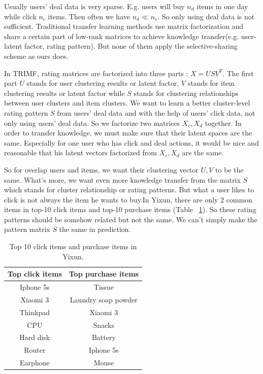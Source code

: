 Usually users' deal data is very sparse. E.g. users will buy $n_d$ items in one day while click $n_c$ items. Then often we have $n_d \ll n_c$. So only using deal data is not sufficient. Traditional transfer learning methods use matrix factorization and share a certain part of low-rank matrices to achieve knowledge transfer(e.g. user-latent factor, rating pattern). But none of them apply the selective-sharing scheme as ours does.

In TRIMF, rating matrices are factorized into three parts : $X = USV^T$. The first part $U$ stands for user clustering results or latent factor, $V$ stands for item clustering results or latent factor while $S$ stands for clustering relationships between user clusters and item clusters. We want to learn a better cluster-level rating pattern $S$ from users' deal data and with the help of users' click data, not only using users' deal data. So we factorize two matrices $X_c, X_d$ together. In order to transfer knowledge, we must make sure that their latent spaces are the same. Especially for one user who has click and deal actions, it would be nice and reasonable that his latent vectors factorized from $X_c, X_d$ are the same.

So for overlap users and items, we want their clustering vector $U,V$ to be the same. What's more, we want even more knowledge transfer from the matrix $S$ which stands for cluster relationship or rating patterns. But what a user likes to click is not always the item he wants to buy.In Yixun, there are only 2 common items in top-10 click items and top-10 purchase items (Table ~\ref{tbl:topitem}). So these rating patterns should be somehow related but not the same.  We can't simply make the pattern matrix $S$ the same in prediction.

\begin{table}[h]

\label{tbl:topitem}
\begin{center}
\begin{tabular}{| c | c |}
\hline
Top click items & Top purchase items \\
\hline
Iphone 5s & Tissue\\
Xiaomi 3 & Laundry soap powder\\
Thinkpad & Xiaomi 3\\
CPU & Snacks\\
Hard disk & Battery\\
Router & Iphone 5s\\
Earphone & Mouse\\
\hline
\end{tabular}
\caption{Top 10 click items and purchase items in Yixun.}
\end{center}
\end{table}

